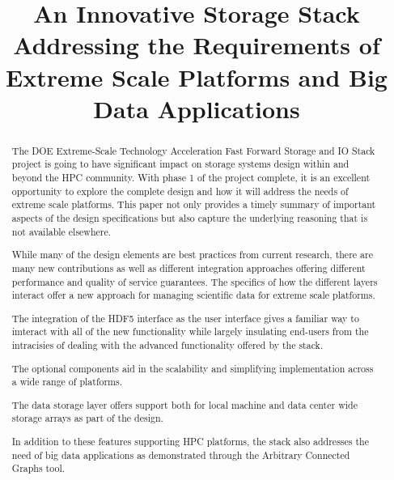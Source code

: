 \documentclass[conference]{IEEEtran}
\begin{document}

\title{An Innovative Storage Stack Addressing the Requirements of Extreme Scale Platforms and Big Data Applications}

\author{
}
\maketitle

\begin{abstract}
The DOE Extreme-Scale Technology Acceleration Fast Forward Storage and IO Stack
project is going to have significant impact on storage systems design within
and beyond the HPC community. With phase 1 of the project complete, it is an
excellent opportunity to explore the complete design and how it will address
the needs of extreme scale platforms.  This paper not only provides a timely
summary of important aspects of the design specifications but also capture the
underlying reasoning that is not available elsewhere.

While many of the design elements are best practices from current research,
there are many new contributions as well as different integration approaches
offering different performance and quality of service guarantees. The specifics
of how the different layers interact offer a new approach for managing
scientific data for extreme scale platforms.

The integration of the HDF5 interface as the user interface gives a familiar
way to imteract with all of the new functionality while largely insulating 
end-users from the intracisies of dealing with the advanced functionality
offered by the stack.

The optional components aid in the scalability and simplifying implementation
across a wide range of platforms.

The data storage layer offers support both for local machine and data center
wide storage arrays as part of the design.

In addition to these features supporting HPC platforms, the stack also addresses
the need of big data applications as demonstrated through the Arbitrary Connected Graphs tool.

\end{abstract}
\end{document}
